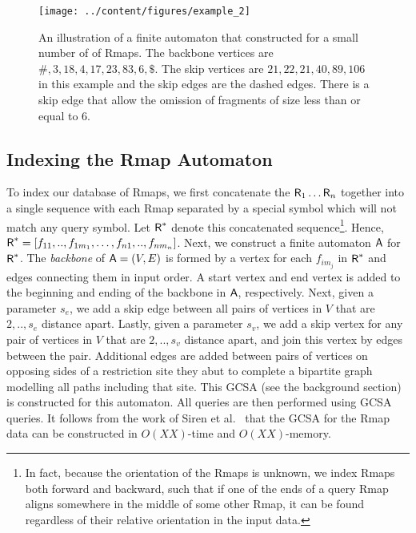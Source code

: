 \begin{figure*}[htb]
  \centering
  \texttt{[image: ../content/figures/example\_2]}
  \caption{An illustration of a finite automaton that constructed for a small number of of Rmaps.  The backbone vertices are $\#, 3, 18, 4, 17, 23, 83, 6, \$$.  The skip vertices are  $21, 22, 21, 40, 89, 106$ in this example and the skip edges are the dashed edges.  There is a skip edge that allow the omission of fragments of size less than or equal to 6.}
\label{fig:example}
\end{figure*}



\subsection{Indexing the Rmap Automaton}

To index our database of Rmaps, we first concatenate the $\mbox{\rm {\sf R}}_1 \ldots \mbox{\rm {\sf R}}_n$ together into a single sequence with each Rmap separated by  a special symbol which will not match any query symbol. Let $\mbox{\rm {\sf R}}^*$ denote this concatenated sequence\footnote{In fact, because the orientation of the Rmaps is unknown, we index Rmaps both forward and backward, such that if one of the ends of a query Rmap aligns somewhere in the middle of some other Rmap, it can be found regardless of their relative orientation in the input data.}. Hence, $\mbox{\rm {\sf R}}^* = [f_{11},..,f_{1m_1}, \ldots, f_{n1},..,f_{nm_n}]$.  Next, we construct a finite automaton $\mathsf{A}$ for $\mbox{\rm {\sf R}}^*$.  The {\em backbone} of $\mathsf{A} = (V, E)$ is formed by a vertex for each $f_{im_j}$ in $\mbox{\rm {\sf R}}^*$ and edges connecting them in input order.  A start vertex and end vertex is added to the beginning and ending of the backbone in $\mathsf{A}$, respectively. Next, given a parameter $s_e$, we add a skip edge between all pairs of vertices in $V$ that are $2,..,s_e$ distance apart.  Lastly, given a parameter $s_v$, we add a skip vertex for any pair of vertices in $V$ that are $2,..,s_v$ distance apart, and join this vertex by edges between the pair.  Additional edges are added between pairs of vertices on opposing sides of a restriction site they abut to complete a bipartite graph modelling all paths including that site.  This GCSA (see the background section) is constructed for this automaton.  All queries are then performed using GCSA queries. It follows from the work of Siren et al.~\cite{dag_method} that the GCSA for the Rmap data can be constructed in $O(XX)$-time and $O(XX)$-memory.   

